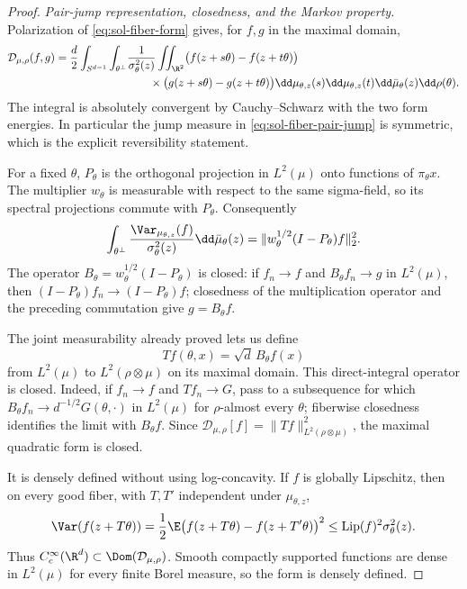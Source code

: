 \documentclass[../main.tex]{subfiles}
\begin{document}
\begin{proof}
\emph{Pair-jump representation, closedness, and the Markov property.}
Polarization of \eqref{eq:sol-fiber-form} gives, for $f,g$ in the maximal domain,
\begin{align}
 \mathcal D_{\mu,\rho}(f,g)
 =\frac d2\int_{S^{d-1}}\int_{\theta^\perp}
 &\frac1{\sigma_\theta^2(z)}
 \iint_{\R^2}
 \bigl(f(z+s\theta)-f(z+t\theta)\bigr)\notag\\
 &\qquad\times
 \bigl(g(z+s\theta)-g(z+t\theta)\bigr)
 \dd\mu_{\theta,z}(s)\dd\mu_{\theta,z}(t)
 \dd\bar\mu_\theta(z)\dd\rho(\theta).
 \label{eq:sol-fiber-pair-jump}
\end{align}
The integral is absolutely convergent by Cauchy--Schwarz with the two form energies.  In
particular the jump measure in \eqref{eq:sol-fiber-pair-jump} is symmetric, which is the explicit
reversibility statement.

For a fixed $\theta$, $P_\theta$ is the orthogonal projection in $L^2(\mu)$ onto functions of
$\pi_\theta x$.  The multiplier $w_\theta$ is measurable with respect to the same sigma-field,
so its spectral projections commute with $P_\theta$.  Consequently
\begin{equation}
  \int_{\theta^\perp}
  \frac{\Var_{\mu_{\theta,z}}(f)}{\sigma_\theta^2(z)}
  \dd\bar\mu_\theta(z)
  =\|w_\theta^{1/2}(I-P_\theta)f\|_2^2.
  \label{eq:sol-fiber-operator-factorization}
\end{equation}
The operator
$B_\theta=w_\theta^{1/2}(I-P_\theta)$ is closed: if $f_n\to f$ and
$B_\theta f_n\to g$ in $L^2(\mu)$, then $(I-P_\theta)f_n\to(I-P_\theta)f$; closedness of the
multiplication operator and the preceding commutation give
$g=B_\theta f$.

The joint measurability already proved lets us define
\begin{equation}
  Tf(\theta,x)=\sqrt d\,B_\theta f(x)
\end{equation}
from $L^2(\mu)$ to $L^2(\rho\otimes\mu)$ on its maximal domain.  This direct-integral operator
is closed.  Indeed, if $f_n\to f$ and $Tf_n\to G$, pass to a subsequence for which
$B_\theta f_n\to d^{-1/2}G(\theta,\cdot)$ in $L^2(\mu)$ for $\rho$-almost every $\theta$;
fiberwise closedness identifies the limit with $B_\theta f$.  Since
$\mathcal D_{\mu,\rho}[f]=\|Tf\|_{L^2(\rho\otimes\mu)}^2$, the maximal quadratic form is closed.

It is densely defined without using log-concavity.  If $f$ is globally Lipschitz, then on every
good fiber, with $T,T'$ independent under $\mu_{\theta,z}$,
\begin{equation}
 \Var(f(z+T\theta))
 =\frac12\E\bigl(f(z+T\theta)-f(z+T'\theta)\bigr)^2
 \le \operatorname{Lip}(f)^2\sigma_\theta^2(z).
 \label{eq:sol-fiber-lipschitz-density}
\end{equation}
Thus $C_c^\infty(\R^d)\subset\Dom(\mathcal D_{\mu,\rho})$.  Smooth compactly supported
functions are dense in $L^2(\mu)$ for every finite Borel measure, so the form is densely defined.


\end{proof}
\end{document}
